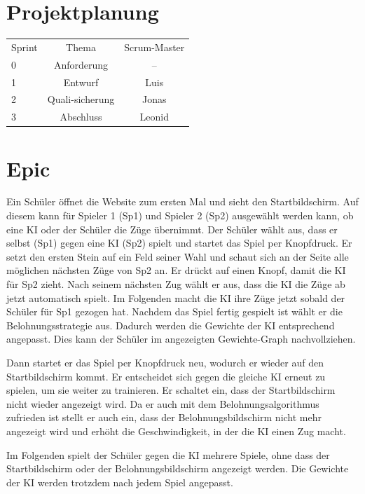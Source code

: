 \documentclass[titlepage]{scrartcl}
\begin{document}
\section{Projektplanung}%
\begin{tabular}{lcc}
	Sprint &Thema& Scrum-Master\\
	0&Anforderung&--\\
	1&Entwurf & Luis\\
	2&Quali-sicherung & Jonas \\
	3&Abschluss & Leonid\\
\end{tabular}


\section{Epic}

Ein Schüler öffnet die Website zum ersten Mal und sieht den Startbildschirm.
Auf diesem kann für Spieler 1 (Sp1) und Spieler 2 (Sp2) ausgewählt werden kann, ob eine KI oder der Schüler die Züge übernimmt.
Der Schüler wählt aus, dass er selbst (Sp1) gegen eine KI (Sp2) spielt und startet das Spiel per Knopfdruck.
Er setzt den ersten Stein auf ein Feld seiner Wahl und schaut sich an der Seite alle möglichen nächsten Züge von Sp2 an.
Er drückt auf einen Knopf, damit die KI für Sp2 zieht.
Nach seinem nächsten Zug wählt er aus, dass die KI die Züge ab jetzt automatisch spielt.
Im Folgenden macht die KI ihre Züge jetzt sobald der Schüler für Sp1 gezogen hat.
Nachdem das Spiel fertig gespielt ist wählt er die Belohnungsstrategie aus.
Dadurch werden die Gewichte der KI entsprechend angepasst.
Dies kann der Schüler im angezeigten Gewichte-Graph nachvollziehen.

Dann startet er das Spiel per Knopfdruck neu, wodurch er wieder auf den Startbildschirm kommt.
Er entscheidet sich gegen die gleiche KI erneut zu spielen, um sie weiter zu trainieren.
Er schaltet ein, dass der Startbildschirm nicht wieder angezeigt wird.
Da er auch mit dem Belohnungsalgorithmus zufrieden ist stellt er auch ein, dass der Belohnungsbildschirm nicht mehr angezeigt wird und erhöht die Geschwindigkeit, in der die KI einen Zug macht.

Im Folgenden spielt der Schüler gegen die KI mehrere Spiele, ohne dass der Startbildschirm oder der Belohnungsbildschirm angezeigt werden.
Die Gewichte der KI werden trotzdem nach jedem Spiel angepasst.
\end{document}
